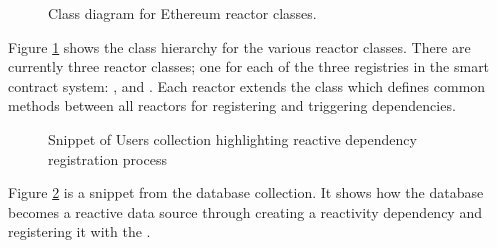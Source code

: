 \begin{figure}
\centering
{}
\decoRule
\caption[Reactors Class Diagram]{Class diagram for Ethereum reactor classes.}
\label{fig:ReactorsClassDiagram}
\end{figure}

Figure \ref{fig:ReactorsClassDiagram} shows the class hierarchy for the various reactor classes. There are currently three reactor classes; one for each of the three registries in the smart contract system: ,  and . Each reactor extends the  class which defines common methods between all reactors for registering and triggering dependencies. \\

\begin{figure}
\centering
{}
\decoRule
\caption[Dependency Registration in Users Collection]{Snippet of Users collection highlighting reactive dependency registration process}
\label{fig:UsersDepRegistration}
\end{figure}

Figure \ref{fig:UsersDepRegistration} is a snippet from the  database collection. It shows how the database becomes a reactive data source through creating a reactivity dependency and registering it with the . \\

